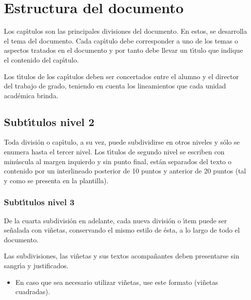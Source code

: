 \chapter{Estructura del documento}
Los cap\'{\i}tulos son las principales divisiones del documento. En estos, se desarrolla el tema del documento. Cada cap\'{\i}tulo debe corresponder a uno de los temas o aspectos tratados en el documento y por tanto debe llevar un t\'{\i}tulo que indique el contenido del cap\'{\i}tulo.

Los t\'{\i}tulos de los cap\'{\i}tulos deben ser concertados entre el alumno y el director del trabajo de grado, teniendo en cuenta los lineamientos que cada unidad acad\'{e}mica brinda.

\section{Subt\'{\i}tulos nivel 2}
Toda divisi\'{o}n o cap\'{\i}tulo, a su vez, puede subdividirse en otros niveles y s\'{o}lo se enumera hasta el tercer nivel. Los t\'{\i}tulos de segundo nivel se escriben con min\'{u}scula al margen izquierdo y sin punto final, est\'{a}n separados del texto o contenido por un interlineado posterior de 10 puntos y anterior de 20 puntos (tal y como se presenta en la plantilla).

\subsection{Subt\'{\i}tulos nivel 3}
De la cuarta subdivisi\'{o}n en adelante, cada nueva divisi\'{o}n o \'{\i}tem puede ser se\~{n}alada con vi\~{n}etas, conservando el mismo estilo de \'{e}sta, a lo largo de todo el documento.

Las subdivisiones, las vi\~{n}etas y sus textos acompa\~{n}antes deben presentarse sin sangr\'{\i}a y justificados.

\begin{itemize}
\item En caso que sea necesario utilizar vi\~{n}etas, use este formato (vi\~{n}etas cuadradas).
\end{itemize} 